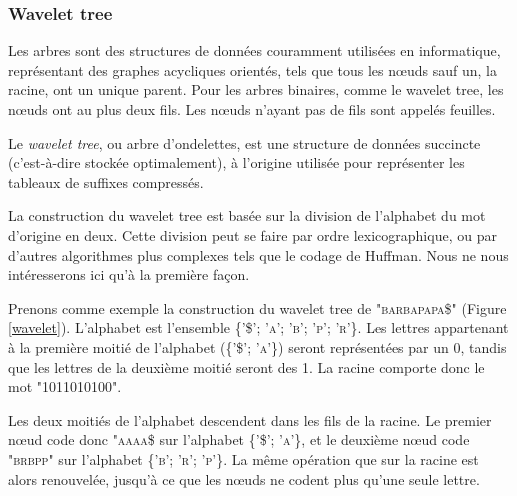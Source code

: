 \subsubsection{Wavelet tree}
Les arbres sont des structures de données couramment utilisées en informatique, représentant des graphes acycliques orientés, tels que tous les nœuds sauf un, la racine, ont un unique parent. Pour les arbres binaires, comme le wavelet tree, les nœuds ont au plus deux fils. Les nœuds n'ayant pas de fils sont appelés feuilles.

Le \textit{wavelet tree}, ou arbre d'ondelettes, est une structure de données succincte (c'est-à-dire stockée optimalement), à l'origine utilisée pour représenter les tableaux de suffixes compressés.

La construction du wavelet tree est basée sur la division de l'alphabet du mot d'origine en deux. Cette division peut se faire par ordre lexicographique, ou par d'autres algorithmes plus complexes tels que le codage de Huffman. Nous ne nous intéresserons ici qu'à la première façon.

Prenons comme exemple la construction du wavelet tree de \textsc{"barbapapa\$"} (Figure \ref{wavelet}). L'alphabet est l'ensemble \textsc{\{'\$'; 'a'; 'b'; 'p'; 'r'\}}. Les lettres appartenant à la première moitié de l'alphabet (\textsc{\{'\$'; 'a'\}}) seront représentées par un 0, tandis que les lettres de la deuxième moitié seront des 1. La racine comporte donc le mot "1011010100".

Les deux moitiés de l'alphabet descendent dans les fils de la racine. Le premier nœud code donc \textsc{"aaaa\$} sur l'alphabet \textsc{\{'\$'; 'a'\}}, et le deuxième nœud code \textsc{"brbpp"} sur l'alphabet \textsc{\{'b'; 'r'; 'p'\}}. La même opération que sur la racine est alors renouvelée, jusqu'à ce que les nœuds ne codent plus qu'une seule lettre.

